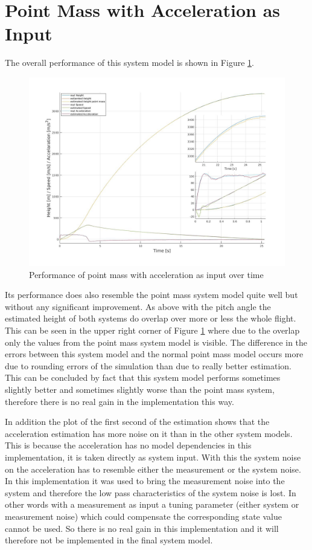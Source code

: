 \newpage
\section{Point Mass with Acceleration as Input}
The overall performance of this system model is shown in Figure \ref{fig:PointMassAccInputPerformance}.

\begin{figure}[h!]
 \centering
 \includegraphics[width=.8 \textwidth]{./Pictures/PointMassAccInputPerformance.jpg}
 \caption{Performance of point mass with acceleration as input over time}
 \label{fig:PointMassAccInputPerformance}
\end{figure}

Its performance does also resemble the point mass system model quite well but without any significant improvement.
As above with the pitch angle the estimated height of both systems do overlap over more or less the whole flight.
This can be seen in the upper right corner of Figure \ref{fig:PointMassAccInputPerformance} where due to the overlap only the values from the point mass system model is visible.
The difference in the errors between this system model and the normal point mass model occurs more due to rounding errors of the simulation than due to really better estimation.
This can be concluded by fact that this system model performs sometimes slightly better and sometimes slightly worse than the point mass system, therefore there is no real gain in the implementation this way.

In addition the plot of the first second of the estimation shows that the acceleration estimation has more noise on it than in the other system models.
This is because the acceleration has no model dependencies in this implementation, it is taken directly as system input.
With this the system noise on the acceleration has to resemble either the measurement or the system noise.
In this implementation it was used to bring the measurement noise into the system and therefore the low pass characteristics of the system noise is lost.
In other words with a measurement as input a tuning parameter (either system or measurement noise) which could compensate the corresponding state value cannot be used.
So there is no real gain in this implementation and it will therefore not be implemented in the final system model.


